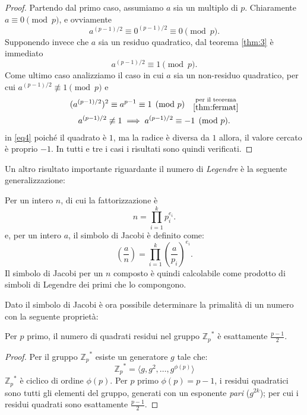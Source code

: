 \begin{proof}
    Partendo dal primo caso, assumiamo $a$ sia un multiplo di $p$. Chiaramente  $a \equiv 0 \pmod p$, e ovviamente 
    \[
        a^{(p-1)/2} \equiv 0^{(p-1)/2} \equiv 0 \pmod p .
    \]
    Supponendo invece che $a$ sia un residuo quadratico, dal teorema \ref{thm:3} è immediato 
    \[
        a^{(p-1)/2} \equiv 1 \pmod p .
    \]
    Come ultimo caso analizziamo il caso in cui $a$ sia un non-residuo quadratico, per cui $a^{(p-1)/2} \not\equiv 1 \pmod p$ e 
    \begin{gather}        
        (a^{(p-1)/2})^2 \equiv a^{p-1} \equiv 1 \pmod p \quad \substack{\text{per il teorema} \\ \ref{thm:fermat}}\\  
        a^{(p-1)/2} \not\equiv 1 \implies a^{(p-1)/2} \equiv -1 \pmod p . \label{eq4}
    \end{gather}
    in \ref*{eq4} poiché il quadrato è $1$, ma la radice è diversa da $1$ allora, il valore cercato è proprio $-1$. In tutti e tre i casi i risultati sono quindi verificati.
\end{proof}

\noindent Un altro risultato importante riguardante il numero di \emph{Legendre} è la seguente generalizzazione:
\begin{definition}
    Per un intero $n$, di cui la fattorizzazione è
    \[
        n = \prod_{i=1}^{k}p_i^{e_i}.
    \]
    e, per un intero $a$, il simbolo di Jacobi è definito come:
    \[
        \left( \frac{a}{n}\right) = \prod_{i=1}^{k} \left(\frac{a}{p_i}\right)^{e_i}.
    \]
    Il simbolo di Jacobi per un $n$ composto è quindi calcolabile come prodotto di simboli di Legendre dei primi che lo compongono.
\end{definition}

\noindent
Dato il simbolo di Jacobi è ora possibile determinare la primalità di un numero con la seguente proprietà:
\begin{theorem}
    Per $p$ primo, il numero di quadrati residui nel gruppo ${\mathbb{Z}_p}^*$ è esattamente $\frac{p-1}{2}$.
\end{theorem}
\begin{proof}
    Per il gruppo ${\mathbb{Z}_p}^*$ esiste un generatore $g$ tale che: 
    \[ 
        {\mathbb{Z}_p}^* = \langle g,g^2,\dots,g^{\phi(p)} \rangle
    \]
    ${\mathbb{Z}_p}^*$ è ciclico di ordine $\phi(p)$. Per $p$ primo $\phi(p) = p-1$, i residui quadratici sono tutti gli elementi del gruppo, generati con un esponente \emph{pari} ($g^{2k}$); per cui i residui quadrati sono esattamente $\frac{p-1}{2}$.

\end{proof}

